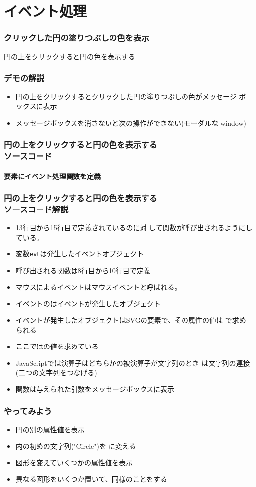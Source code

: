 \section{イベント処理}
\begin{frame}[containsverbatim]
 \frametitle{クリックした円の塗りつぶしの色を表示}
 円の上をクリックすると円の色を表示する
\end{frame}
\begin{frame}[containsverbatim]
 \frametitle{デモの解説}
 \begin{itemize}
  \item 円の上をクリックするとクリックした円の塗りつぶしの色がメッセージ
        ボックスに表示
  \item メッセージボックスを消さないと次の操作ができない(モーダルな
        window)
 \end{itemize}
\end{frame}
\begin{frame}[containsverbatim]
 \frametitle{円の上をクリックすると円の色を表示する\\ソースコード}
 \framesubtitle{要素にイベント処理関数を定義}
\end{frame}
\begin{frame}[containsverbatim]
 \frametitle{円の上をクリックすると円の色を表示する\\ソースコード解説}
 \begin{itemize}
  \item 13行目から15行目で定義されているのに対
        して関数が呼び出されるようにしている。
  \item 変数\texttt{evt}は発生したイベントオブジェクト
  \item 呼び出される関数は8行目から10行目で定義
  \item マウスによるイベントはマウスイベントと呼ばれる。
  \item イベントのはイベントが発生したオブジェクト
  \item イベントが発生したオブジェクトはSVGの要素で、その属性の値は
        で求められる
  \item ここではの値を求めている
  \item JavaScriptでは\JSKey{+}演算子はどちらかの被演算子が文字列のとき
        は文字列の連接(二つの文字列をつなげる)
  \item 関数は与えられた引数をメッセージボックスに表示
 \end{itemize}
\end{frame}
\begin{frame}[containsverbatim]
 \frametitle{やってみよう}
\begin{itemize}
  \item 円の別の属性値を表示
  \item {}内の初めの文字列("Circle")を
        に変える
  \item 図形を変えていくつかの属性値を表示
  \item 異なる図形をいくつか置いて、同様のことをする
\end{itemize}
 \end{frame}
